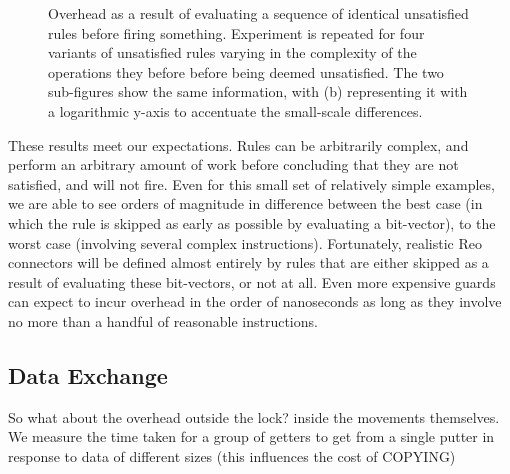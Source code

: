 \begin{figure}
{\begin{subfigure}[b]{0.63\textwidth}
			\caption{}
			\label{fig:check_time_2}
		\end{subfigure}%
	}
	\caption[TODO]{Overhead as a result of evaluating a sequence of identical unsatisfied rules before firing something. Experiment is repeated for four variants of unsatisfied rules varying in the complexity of the operations they before before being deemed unsatisfied. The two sub-figures show the same information, with (b) representing it with a logarithmic y-axis to accentuate the small-scale differences.}
	\label{fig:check_time}
\end{figure}

These results meet our expectations. Rules can be arbitrarily complex, and perform an arbitrary amount of work before concluding that they are not satisfied, and will not fire. Even for this small set of relatively simple examples, we are able to see orders of magnitude in difference between the best case (in which the rule is skipped as early as possible by evaluating a bit-vector), to the worst case (involving several complex instructions). Fortunately, realistic Reo connectors will be defined almost entirely by rules that are either skipped as a result of evaluating these bit-vectors, or not at all. Even more expensive guards can expect to incur overhead in the order of nanoseconds as long as they involve no more than a handful of reasonable instructions.


\subsection{Data Exchange}
So what about the overhead outside the lock? inside the movements themselves. We measure the time taken for a group of getters to get from a single putter in response to data of different sizes (this influences the cost of COPYING)




